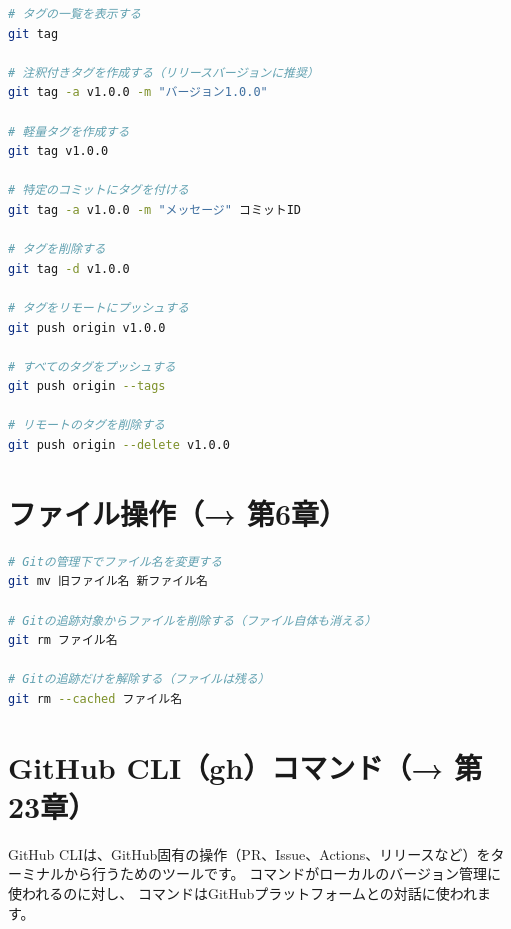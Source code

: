\begin{lstlisting}[language=bash]
# タグの一覧を表示する
git tag

# 注釈付きタグを作成する（リリースバージョンに推奨）
git tag -a v1.0.0 -m "バージョン1.0.0"

# 軽量タグを作成する
git tag v1.0.0

# 特定のコミットにタグを付ける
git tag -a v1.0.0 -m "メッセージ" コミットID

# タグを削除する
git tag -d v1.0.0

# タグをリモートにプッシュする
git push origin v1.0.0

# すべてのタグをプッシュする
git push origin --tags

# リモートのタグを削除する
git push origin --delete v1.0.0
\end{lstlisting}

\section{ファイル操作（→ 第6章）}

\begin{lstlisting}[language=bash]
# Gitの管理下でファイル名を変更する
git mv 旧ファイル名 新ファイル名

# Gitの追跡対象からファイルを削除する（ファイル自体も消える）
git rm ファイル名

# Gitの追跡だけを解除する（ファイルは残る）
git rm --cached ファイル名
\end{lstlisting}

\section{GitHub CLI（gh）コマンド（→ 第23章）}

GitHub CLIは、GitHub固有の操作（PR、Issue、Actions、リリースなど）をターミナルから行うためのツールです。 コマンドがローカルのバージョン管理に使われるのに対し、 コマンドはGitHubプラットフォームとの対話に使われます。

